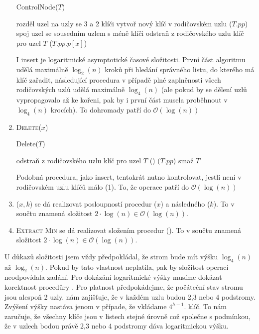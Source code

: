 \documentclass[12pt]{iv003}
\begin{document}
\begin{enumerate}
	\begin{procedure}[H]
		\caption{ControlNode($T$) }
		\Output{}
		 {
			rozděl uzel na uzly se 3 a 2 klíči \;
			 {
				vytvoř nový klíč v rodičovském uzlu 
			} 
			\ffcontrolnode($T.pp$) 
		}
		 {
			spoj uzel se sousedním uzlem s méně klíči \;			
			odstraň z rodičovského uzlu klíč pro uzel $T$ \;
			\ffcontrolnode($T.pp.p[x]$) 
		}
	\end{procedure}
	I insert je logaritmické asymptotické časové složitosti. První část algoritmu udělá maximálně $\log_{2}(n)$ kroků při hledání správného listu, do kterého má klíč zařadit, následující procedura \ffcontrolnode v případě plné zaplněnosti všech rodičovských uzlů udělá maximálně $\log_{4}(n)$ (ale pokud by se dělení uzlů vypropagovalo až ke kořeni, pak by i první část musela proběhnout v $\log_{4}(n)$ krocích). To dohromady patří do $\mathcal{O}(\log(n))$
	\item \textsc{Delete}($x$)
	
	\begin{procedure}[H]
		\caption{Delete($T$) }
		\Output{}
		odstraň z rodičovského uzlu klíč pro uzel $T$ \; 
		\ffupdatekey() 
		\ffcontrolnode($T.pp$) \;
		smaž $T$ \; 
	\end{procedure}
	
	Podobná procedura, jako insert, tentokrát nutno kontrolovat, jestli není v rodičovském uzlu klíčů málo (1). To, že operace patří do $\mathcal{O}(\log(n))$
	\item \ffdecreasekey($x,k$) se dá realizovat posloupností procedur \ffdelete($x$) a následného \ffinsert($k$). To v součtu znamená složitost $2\cdot \log(n) \in \mathcal{O}(\log(n))$.
	\item \textsc{Extract Min} se dá realizovat složením procedur \ffdelete(\ffminimum). To v součtu znamená složitost $2\cdot \log(n) \in \mathcal{O}(\log(n))$.
\end{enumerate}
U důkazů složitosti jsem vždy předpokládal, že strom bude mít výšku $\log_{4}(n)$ 
až $\log_{2}(n)$. Pokud by tato vlastnost neplatila, pak by složitost operací neodpovídala zadání. Pro dokázání logaritmické výšky musíme dokázat korektnost procedůry \ffcontrolnode. Pro platnost předpokádejme, že počáteční stav stromu jsou alespoň 2 uzly. \ffcontrolnode nám zajišťuje, že v každém uzlu budou 2,3 nebo 4 podstromy. Zvýšení výšky  nastáva jenom v případe, že vkládame $4^{h - 1}$. klíč. To nám zaručuje, že všechny klíče jsou v listech stejné úrovně což společne s podmínkou, že v uzlech bodou právě 2,3 nebo 4 podstromy dáva logaritmickou výšku.    
\end{document}
